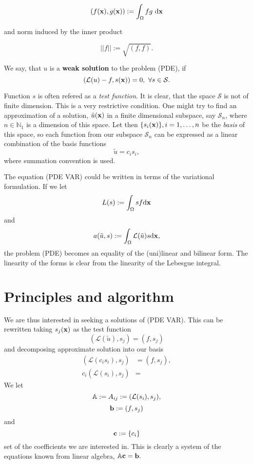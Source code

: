 $$ (f(\mathbf{x}), g(\mathbf{x})) := \int_\Omega fg ~\mathrm{d\mathbf{x}} $$

and norm induced by the inner product

$$||f|| := \sqrt{( f, f )}.$$

We say, that $u$ is a \textbf{weak solution} to the problem (PDE), if
$$ ( \mathcal{L}(u) - f, s(\mathbf{x})) = 0,~\forall s \in \mathcal{S}. $$

\par Function $s$ is often refered as a \textit{test function}. It is clear, that the space $\mathcal{S}$ is not of finite dimension. This is a very restrictive condition. 
One might try to find an approximation of a solution, $\tilde u(\mathbf{x})$ in a finite dimensional subspace, say $\mathcal{S}_n$, where $n \in \mathbb{N}_1$ is a dimension of this space. Let then $\{s_i(\mathbf{x})\}, i=1,\ldots,n$
be the \textit{basis} of this space, so each function from our subspace $\mathcal{S}_n$ can be expressed as a linear combination of the basis functions
$$ \tilde u = c_i s_i,$$
where summation convention is used.

\par The equation (PDE VAR) could be written in terms of the variational formulation. If we let
$$ L(s) := \int_\Omega sf \mathrm d \mathbf{x} $$
and
$$ a(\tilde u, s) := \int_\Omega \mathcal L (\tilde u) s \mathrm d \mathbf{x}, $$
the problem (PDE) becomes an equality of the (uni)linear and bilinear form. The linearity of the forms is clear from the linearity of the Lebesgue integral. 

\section{Principles and algorithm}

\par We are thus interested in seeking a solutions of (PDE VAR). This can be rewritten taking $s_j(\mathbf{x})$ as the test function
$$ ( \mathcal L (\tilde u), s_j ) = (f, s_j ) $$
and decomposing approximate solution into our basis
\begin{align*}
( \mathcal L (c_i s_i), s_j) &= (f, s_j), \\
c_i ( \mathcal L (s_i), s_j) &= 
\end{align*}
We let
$$ \mathbb{A} := A_{ij} := (\mathcal L(s_i), s_j), $$
$$ \mathbf{b} := (f, s_j) $$
and 
$$ \mathbf{c} := \{c_i\} $$
set of the coefficients we are interested in. This is clearly a system of the equations known from linear algebra, $\mathbb{A} \mathbf{c} = \mathbf{b}.$

